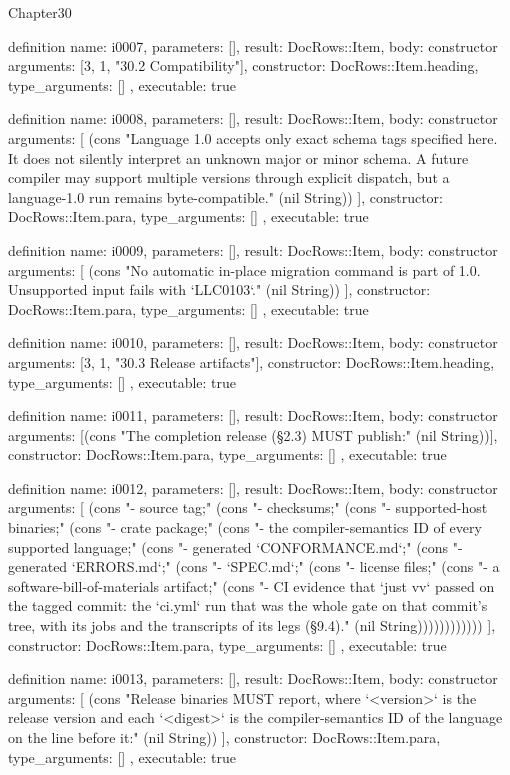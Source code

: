 \begin{lexlean}{Chapter30}
\begin{semanticmodule}
definition{
  name: i0007,
  parameters: [],
  result: DocRows::Item,
  body: constructor{
    arguments: [3, 1, "30.2 Compatibility"],
    constructor: DocRows::Item.heading,
    type_arguments: []
  },
  executable: true
}

definition{
  name: i0008,
  parameters: [],
  result: DocRows::Item,
  body: constructor{
    arguments: [
      (cons "Language 1.0 accepts only exact schema tags specified here. It does not silently interpret an unknown major or minor schema. A future compiler may support multiple versions through explicit dispatch, but a language-1.0 run remains byte-compatible." (nil String))
    ],
    constructor: DocRows::Item.para,
    type_arguments: []
  },
  executable: true
}

definition{
  name: i0009,
  parameters: [],
  result: DocRows::Item,
  body: constructor{
    arguments: [
      (cons "No automatic in-place migration command is part of 1.0. Unsupported input fails with `LLC0103`." (nil String))
    ],
    constructor: DocRows::Item.para,
    type_arguments: []
  },
  executable: true
}

definition{
  name: i0010,
  parameters: [],
  result: DocRows::Item,
  body: constructor{
    arguments: [3, 1, "30.3 Release artifacts"],
    constructor: DocRows::Item.heading,
    type_arguments: []
  },
  executable: true
}

definition{
  name: i0011,
  parameters: [],
  result: DocRows::Item,
  body: constructor{
    arguments: [(cons "The completion release (§2.3) MUST publish:" (nil String))],
    constructor: DocRows::Item.para,
    type_arguments: []
  },
  executable: true
}

definition{
  name: i0012,
  parameters: [],
  result: DocRows::Item,
  body: constructor{
    arguments: [
      (cons "- source tag;" (cons "- checksums;" (cons "- supported-host binaries;" (cons "- crate package;" (cons "- the compiler-semantics ID of every supported language;" (cons "- generated `CONFORMANCE.md`;" (cons "- generated `ERRORS.md`;" (cons "- `SPEC.md`;" (cons "- license files;" (cons "- a software-bill-of-materials artifact;" (cons "- CI evidence that `just vv` passed on the tagged commit: the `ci.yml` run that was the whole gate on that commit's tree, with its jobs and the transcripts of its legs (§9.4)." (nil String))))))))))))
    ],
    constructor: DocRows::Item.para,
    type_arguments: []
  },
  executable: true
}

definition{
  name: i0013,
  parameters: [],
  result: DocRows::Item,
  body: constructor{
    arguments: [
      (cons "Release binaries MUST report, where `<version>` is the release version and each `<digest>` is the compiler-semantics ID of the language on the line before it:" (nil String))
    ],
    constructor: DocRows::Item.para,
    type_arguments: []
  },
  executable: true
}


\end{semanticmodule}
\end{lexlean}
